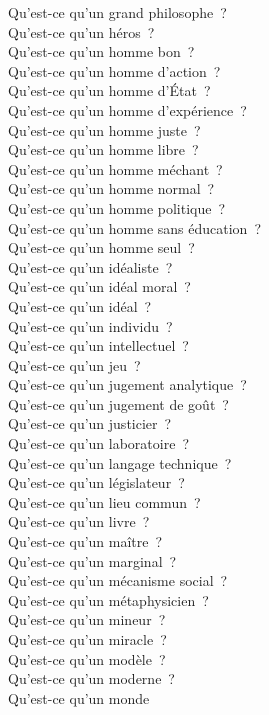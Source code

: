 \documentclass[a4paper,12pt]{article}
\begin{document}
Qu'est-ce qu'un grand philosophe ? \\
Qu'est-ce qu'un héros ? \\
Qu'est-ce qu'un homme bon ? \\
Qu'est-ce qu'un homme d'action ? \\
Qu'est-ce qu'un homme d'État ? \\
Qu'est-ce qu'un homme d'expérience ? \\
Qu'est-ce qu'un homme juste ? \\
Qu'est-ce qu'un homme libre ? \\
Qu'est-ce qu'un homme méchant ? \\
Qu'est-ce qu'un homme normal ? \\
Qu'est-ce qu'un homme politique ? \\
Qu'est-ce qu'un homme sans éducation ? \\
Qu'est-ce qu'un homme seul ? \\
Qu'est-ce qu'un idéaliste ? \\
Qu'est-ce qu'un idéal moral ? \\
Qu'est-ce qu'un idéal ? \\
Qu'est-ce qu'un individu ? \\
Qu'est-ce qu'un intellectuel ? \\
Qu'est-ce qu'un jeu ? \\
Qu'est-ce qu'un jugement analytique ? \\
Qu'est-ce qu'un jugement de goût ? \\
Qu'est-ce qu'un justicier ? \\
Qu'est-ce qu'un laboratoire ? \\
Qu'est-ce qu'un langage technique ? \\
Qu'est-ce qu'un législateur ? \\
Qu'est-ce qu'un lieu commun ? \\
Qu'est-ce qu'un livre ? \\
Qu'est-ce qu'un maître ? \\
Qu'est-ce qu'un marginal ? \\
Qu'est-ce qu'un mécanisme social ? \\
Qu'est-ce qu'un métaphysicien ? \\
Qu'est-ce qu'un mineur ? \\
Qu'est-ce qu'un miracle ? \\
Qu'est-ce qu'un modèle ? \\
Qu'est-ce qu'un moderne ? \\
Qu'est-ce qu'un monde \\
\end{document}

